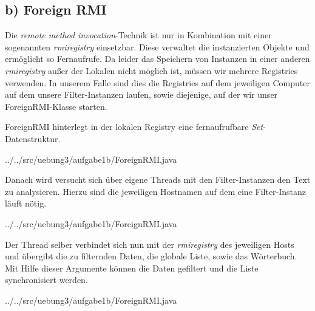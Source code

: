 \subsection*{b) Foreign RMI}

Die \textit{remote method invocation}-Technik ist nur in Kombination mit einer sogenannten \textit{rmiregistry} einsetzbar.
Diese verwaltet die instanzierten Objekte und ermöglicht so Fernaufrufe.
Da leider das Speichern von Instanzen in einer anderen \textit{rmiregistry} außer der Lokalen 
nicht möglich ist, müssen wir mehrere Registries verwenden.
In unserem Falle sind dies die Registries auf dem jeweiligen Computer auf dem unsere Filter-Instanzen laufen,
sowie diejenige, auf der wir unser ForeignRMI-Klasse starten.

ForeignRMI hinterlegt in der lokalen Registry eine fernaufrufbare \textit{Set}-Datenstruktur.

{../../src/uebung3/aufgabe1b/ForeignRMI.java}

Danach wird versucht sich über eigene Threads mit den Filter-Instanzen den Text zu analysieren.
Hierzu sind die jeweiligen Hostnamen auf dem eine Filter-Instanz läuft nötig.

{../../src/uebung3/aufgabe1b/ForeignRMI.java}

Der Thread selber verbindet sich nun mit der \textit{rmiregistry} des jeweiligen Hosts und 
übergibt die zu filternden Daten, die globale Liste, sowie das Wörterbuch.
Mit Hilfe dieser Argumente können die Daten gefiltert und die Liste synchronisiert werden.

{../../src/uebung3/aufgabe1b/ForeignRMI.java}
